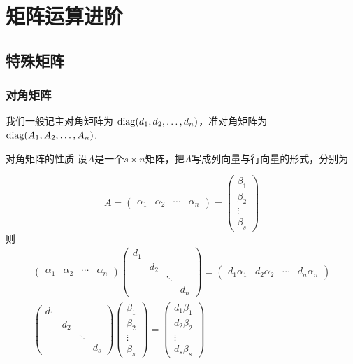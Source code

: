 \chapter{矩阵运算进阶} \label{chap:矩阵运算进阶}

\section{特殊矩阵}

\subsection{对角矩阵}

我们一般记主对角矩阵为 $\operatorname{diag}(d_1,d_2,\ldots,d_n)$，准对角矩阵为 $\operatorname{diag}(A_1,A_2,\ldots,A_n)$.
\begin{theorem}{}{对角矩阵的性质}
    设$A$是一个$s \times n$矩阵，把$A$写成列向量与行向量的形式，分别为

    \[ A = \begin{pmatrix}\alpha_1 & \alpha_2 & \cdots & \alpha_n\end{pmatrix} = \begin{pmatrix} \beta_1 \\ \beta_2 \\ \vdots \\ \beta_s \end{pmatrix} \]
    则
    \begin{gather*}
        \begin{pmatrix}\alpha_1 & \alpha_2 & \cdots & \alpha_n\end{pmatrix}
        \begin{pmatrix}
            d_1 &     &        &     \\
                & d_2 &        &     \\
                &     & \ddots &     \\
                &     &        & d_n
        \end{pmatrix} = \begin{pmatrix}d_1\alpha_1 & d_2\alpha_2 & \cdots & d_n\alpha_n\end{pmatrix} \\
        \begin{pmatrix}
            d_1 &     &        &     \\
                & d_2 &        &     \\
                &     & \ddots &     \\
                &     &        & d_s
        \end{pmatrix} \begin{pmatrix} \beta_1 \\ \beta_2 \\ \vdots \\ \beta_s \end{pmatrix} = \begin{pmatrix} d_1\beta_1 \\ d_2\beta_2 \\ \vdots \\ d_s\beta_s \end{pmatrix}
    \end{gather*}


\end{theorem}
